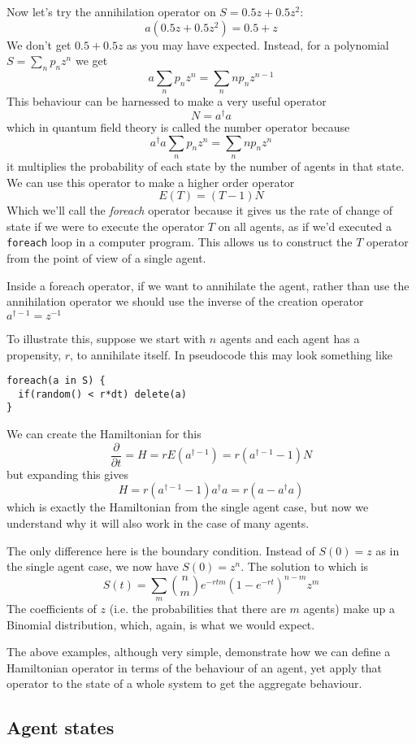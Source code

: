 \documentclass[letterpaper,twocolumn,10pt]{article}
\begin{document}
Now let's try the annihilation operator on $S = 0.5z + 0.5z^2$:
\[
a (0.5z + 0.5z^2) = 0.5 + z
\]
We don't get $0.5 + 0.5z$ as you may have expected. Instead, for a polynomial $S = \sum_n p_nz^n$ we get
\[
a \sum_n p_nz^n = \sum_n n p_n z^{n-1}
\]
This behaviour can be harnessed to make a very useful operator
\[
N = a^\dag a
\]
which in quantum field theory is called the number operator because
\[
a^\dag a \sum_n p_nz^n = \sum_n n p_n z^n
\]
it multiplies the probability of each state by the number of agents in that state. We can use this operator to make a higher order operator
\[
E(T) = (T - 1)N
\]
Which we'll call the \textit{foreach} operator because it gives us the rate of change of state if we were to execute the operator $T$ on all agents, as if we'd executed a \texttt{foreach} loop in a computer program. This allows us to construct the $T$ operator from the point of view of a single agent.

Inside a foreach operator, if we want to annihilate the agent, rather than use the annihilation operator we should use the inverse of the creation operator $a^{\dag -1} = z^{-1}$

To illustrate this, suppose we start with $n$ agents and each agent has a propensity, $r$, to annihilate itself. In pseudocode this may look something like
\begin{verbatim}
foreach(a in S) {
  if(random() < r*dt) delete(a)
}
\end{verbatim}

We can create the Hamiltonian for this
\[
\frac{\partial}{\partial t} = H = rE(a^{\dag-1}) = r(a^{\dag-1} - 1)N
\]
but expanding this gives
\[
H = r(a^{\dag-1} - 1)a^\dag a = r(a - a^\dag a)
\]
which is exactly the Hamiltonian from the single agent case, but now we understand why it will also work in the case of many agents.

The only difference here is the boundary condition. Instead of $S(0) = z$ as in the single agent case, we now have $S(0) = z^n$. The solution to which is
\[
S(t) = \sum_m{n\choose m}e^{-rtm}(1-e^{-rt})^{n-m}z^m
\]
The coefficients of $z$ (i.e. the probabilities that there are $m$ agents) make up a Binomial distribution, which, again, is what we would expect.

The above examples, although very simple, demonstrate how we can define a Hamiltonian operator in terms of the behaviour of an agent, yet apply that operator to the state of a whole system to get the aggregate behaviour.

\subsection{Agent states}
\end{document}
